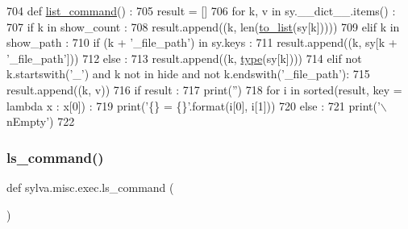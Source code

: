 \begin{DoxyCode}
704 \textcolor{keyword}{def }\hyperlink{namespacesylva_1_1misc_1_1exec_af0ed98897004764988fba9af76290e90}{list\_command}() :
705   result = []
706   \textcolor{keywordflow}{for} k, v \textcolor{keywordflow}{in} sy.\_\_dict\_\_.items() :
707     \textcolor{keywordflow}{if} k \textcolor{keywordflow}{in} show\_count :
708       result.append((k, len(\hyperlink{namespacesylva_1_1misc_1_1util_a03f5cfd365a10a5ec0567e320f987a9b}{to\_list}(sy[k]))))
709     \textcolor{keywordflow}{elif} k \textcolor{keywordflow}{in} show\_path :
710       \textcolor{keywordflow}{if} (k + \textcolor{stringliteral}{'\_file\_path'}) \textcolor{keywordflow}{in} sy.keys :
711         result.append((k, sy[k + \textcolor{stringliteral}{'\_file\_path'}]))
712       \textcolor{keywordflow}{else} :
713         result.append((k, \hyperlink{namespacesylva_1_1misc_1_1exec_a55d55e6d0e68715dfbd883034bd7290c}{type}(sy[k])))
714     \textcolor{keywordflow}{elif} \textcolor{keywordflow}{not} k.startswith(\textcolor{stringliteral}{'\_'}) \textcolor{keywordflow}{and} k \textcolor{keywordflow}{not} \textcolor{keywordflow}{in} hide \textcolor{keywordflow}{and} \textcolor{keywordflow}{not} k.endswith(\textcolor{stringliteral}{'\_file\_path'}):
715       result.append((k, v))
716   \textcolor{keywordflow}{if} result :
717     print(\textcolor{stringliteral}{''})
718     \textcolor{keywordflow}{for} i \textcolor{keywordflow}{in} sorted(result, key = \textcolor{keyword}{lambda} x : x[0]) :
719       print(\textcolor{stringliteral}{'\{\} = \{\}'}.format(i[0], i[1]))
720   \textcolor{keywordflow}{else} :
721     print(\textcolor{stringliteral}{'\(\backslash\)nEmpty'})
722 
\end{DoxyCode}
\mbox{\label{namespacesylva_1_1misc_1_1exec_a2a286b4556ac1dcfb9fa47e672f7bee0}} 
\subsubsection{\texorpdfstring{ls\+\_\+command()}{ls\_command()}}
{\footnotesize\ttfamily def sylva.\+misc.\+exec.\+ls\+\_\+command (\begin{DoxyParamCaption}{ }\end{DoxyParamCaption})}



